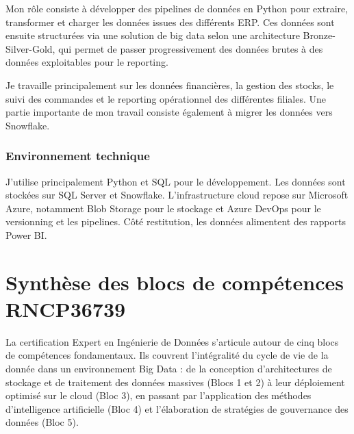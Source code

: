 \documentclass[11pt]{article}
\begin{document}
Mon rôle consiste à développer des pipelines de données en Python pour extraire,
transformer et charger les données issues des différents ERP. Ces données sont
ensuite structurées via une solution de big data selon une architecture
Bronze-Silver-Gold, qui permet de passer progressivement des données brutes à des
données exploitables pour le reporting.

Je travaille principalement sur les données financières, la gestion des stocks, le
suivi des commandes et le reporting opérationnel des différentes filiales. Une partie
importante de mon travail consiste également à migrer les données vers Snowflake.

\subsubsection{Environnement technique}

J'utilise principalement Python et SQL pour le développement. Les données sont
stockées sur SQL Server et Snowflake. L'infrastructure cloud repose sur Microsoft
Azure, notamment Blob Storage pour le stockage et Azure DevOps pour le versionning et
les pipelines. Côté restitution, les données alimentent des rapports Power BI.

\section{Synthèse des blocs de compétences RNCP36739}

La certification \og{}Expert en Ingénierie de Données\fg{} s'articule autour de cinq
blocs de compétences fondamentaux. Ils couvrent l'intégralité du cycle de vie de la
donnée dans un environnement Big Data : de la conception d'architectures de stockage
et de traitement des données massives (Blocs 1 et 2) à leur déploiement optimisé sur
le cloud (Bloc 3), en passant par l'application des méthodes d'intelligence
artificielle (Bloc 4) et l'élaboration de stratégies de gouvernance des données
(Bloc 5).
\end{document}
